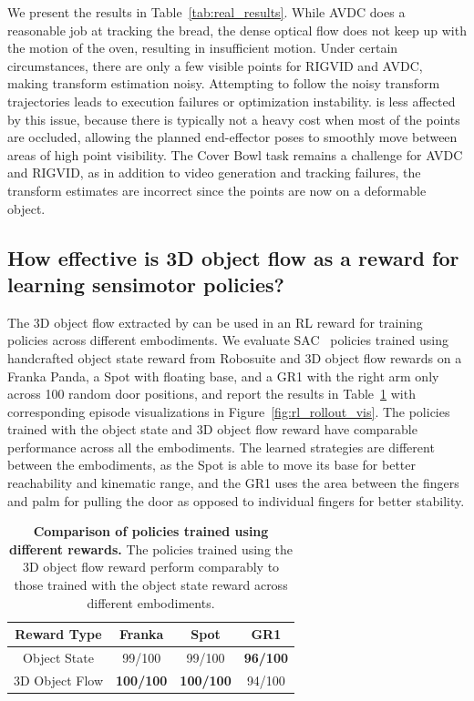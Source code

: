 We present the results in Table~\ref{tab:real_results}. While AVDC does a reasonable job at tracking the bread, the dense optical flow does not keep up with the motion of the oven, resulting in insufficient motion. Under certain circumstances, there are only a few visible points for RIGVID and AVDC, making transform estimation noisy. Attempting to follow the noisy transform trajectories leads to execution failures or optimization instability. \algo is less affected by this issue, because there is typically not a heavy cost when most of the points are occluded, allowing the planned end-effector poses to smoothly move between areas of high point visibility. The Cover Bowl task remains a challenge for AVDC and RIGVID, as in addition to video generation and tracking failures, the transform estimates are incorrect since the points are now on a deformable object.

\subsection{How effective is 3D
object flow as a reward for learning sensimotor policies?}
The 3D object flow extracted by \algo can be used in an RL reward for training policies across different embodiments. We evaluate SAC~\cite{haarnojaSAC2018} policies trained using handcrafted object state reward from Robosuite and 3D object flow rewards on a Franka Panda, a Spot with floating base, and a GR1 with the right arm only across 100 random door positions, and report the results in Table~\ref{tab:rl_results} with corresponding episode visualizations in Figure~\ref{fig:rl_rollout_vis}. The policies trained with the object state and 3D object flow reward have comparable performance across all the embodiments. The learned strategies are different between the embodiments, as the Spot is able to move its base for better reachability and kinematic range, and the GR1 uses the area between the fingers and palm for pulling the door as opposed to individual fingers for better stability.

\begin{table}[!tbp]
    \centering
    \begin{tabular}{c|ccc}
    \toprule
    Reward Type & Franka & Spot & GR1 \\
    \midrule
    Object State & 99/100 & 99/100 & \textbf{96/100}\\
    3D Object Flow & \textbf{100/100} & \textbf{100/100} & 94/100 \\
    \bottomrule
    \end{tabular}
\caption{\textbf{Comparison of policies trained using different rewards.} The policies trained using the 3D object flow reward perform comparably to those trained with the object state reward across different embodiments.}
\label{tab:rl_results}
\end{table}

